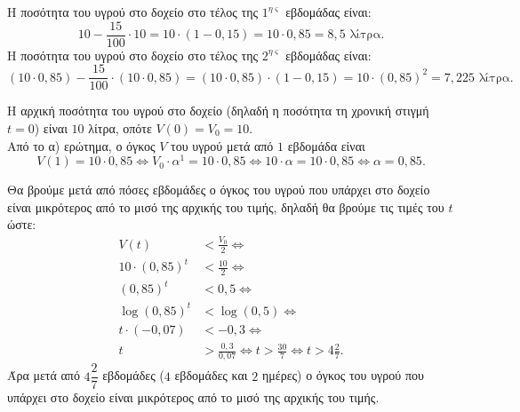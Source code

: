 \begin{alist}
\item Η ποσότητα του υγρού στο δοχείο στο τέλος της $1^{\eta\varsigma}$ εβδομάδας είναι:
\[10 - \frac{15}{100}\cdot 10 = 10\cdot(1 - 0{,}15) = 10\cdot 0{,}85 = 8{,}5\text{ λίτρα}.\]
Η ποσότητα του υγρού στο δοχείο στο τέλος της $2^{\eta\varsigma}$ εβδομάδας είναι:
\[(10\cdot 0{,}85) - \frac{15}{100}\cdot(10\cdot 0{,}85) = (10\cdot 0{,}85)\cdot(1 - 0{,}15) = 10\cdot(0{,}85)^2 = 7{,}225\text{ λίτρα}.\]
\item Η αρχική ποσότητα του υγρού στο δοχείο (δηλαδή η ποσότητα τη χρονική στιγμή $t = 0$) είναι $10$ λίτρα, οπότε $V(0) = V_0 = 10$. \\
Από το α) ερώτημα, ο όγκος $V$ του υγρού μετά από $1$ εβδομάδα είναι
\[V(1) = 10\cdot 0{,}85 \Leftrightarrow V_0\cdot\alpha^1 = 10\cdot 0{,}85 \Leftrightarrow 10\cdot\alpha = 10\cdot 0{,}85 \Leftrightarrow \alpha = 0{,}85.\]
\item Θα βρούμε μετά από πόσες εβδομάδες ο όγκος του υγρού που υπάρχει στο δοχείο είναι μικρότερος από το μισό της αρχικής του τιμής, δηλαδή θα βρούμε τις τιμές του $t$ ώστε:
\begin{align*}
V(t) &< \frac{V_0}{2} \Leftrightarrow \\
10\cdot(0{,}85)^t &< \frac{10}{2} \Leftrightarrow \\
(0{,}85)^t &< 0{,}5 \Leftrightarrow \\
\log(0{,}85)^t &< \log(0{,}5) \Leftrightarrow \\
t\cdot(-0{,}07) &< -0{,}3 \Leftrightarrow \\
t &> \frac{0{,}3}{0{,}07} \Leftrightarrow t > \frac{30}{7} \Leftrightarrow t > 4\frac{2}{7}.
\end{align*}
Άρα μετά από $4\dfrac{2}{7}$ εβδομάδες ($4$ εβδομάδες και $2$ ημέρες) ο όγκος του υγρού που υπάρχει στο δοχείο είναι μικρότερος από το μισό της αρχικής του τιμής.
\end{alist}

